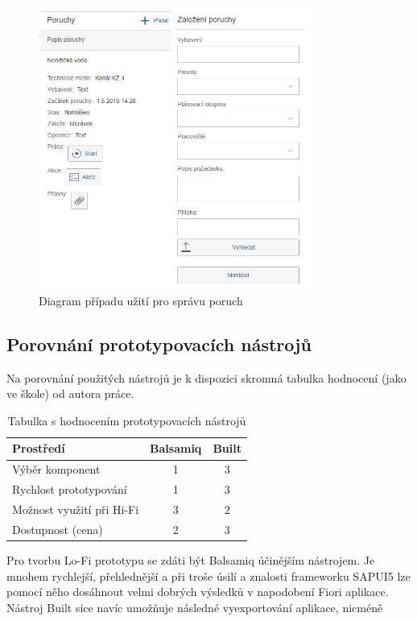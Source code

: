 \documentclass[thesis=M,czech]{FITthesis}[2012/06/26]
\begin{document}
\begin{figure}[H]
	\centering
	\includegraphics[width=0.8\textwidth]{images/bu_mob}
	\caption{Diagram případu užití pro správu poruch}
	\label{img:bu_mob}
\end{figure}

\subsection{Porovnání prototypovacích nástrojů}
Na porovnání použitých nástrojů je k dispozici skromná tabulka hodnocení (jako ve škole) od autora práce.
\begin{center}
	\begin{table}[H]
		\centering
		\begin{tabular}{| l | c | c |}
			\hline 
			Prostředí 						& Balsamiq 	&	Built		\\ 
			\hline	
			\hline
			Výběr komponent					&	1		&	3			\\ 
			\hline
			Rychlost prototypování			&	1		&	3			\\
			\hline
			Možnost využití při Hi-Fi		&	3		&	2			\\
			\hline
			Dostupnost (cena)				&	2		&	3			\\
			\hline		
		\end{tabular}
		\caption {Tabulka s hodnocením prototypovacích nástrojů} 
		\label{tab:prototyp_comp}
	\end{table}
\end{center}
Pro tvorbu Lo-Fi prototypu se zdáti být Balsamiq účinějším nástrojem. Je mnohem rychlejší, přehlednější a při troše úsilí a znalosti frameworku SAPUI5 lze pomocí něho dosáhnout velmi dobrých výsledků v napodobení Fiori aplikace. Nástroj Built sice navíc umožňuje následné vyexportování aplikace, nicméně 
\end{document}
